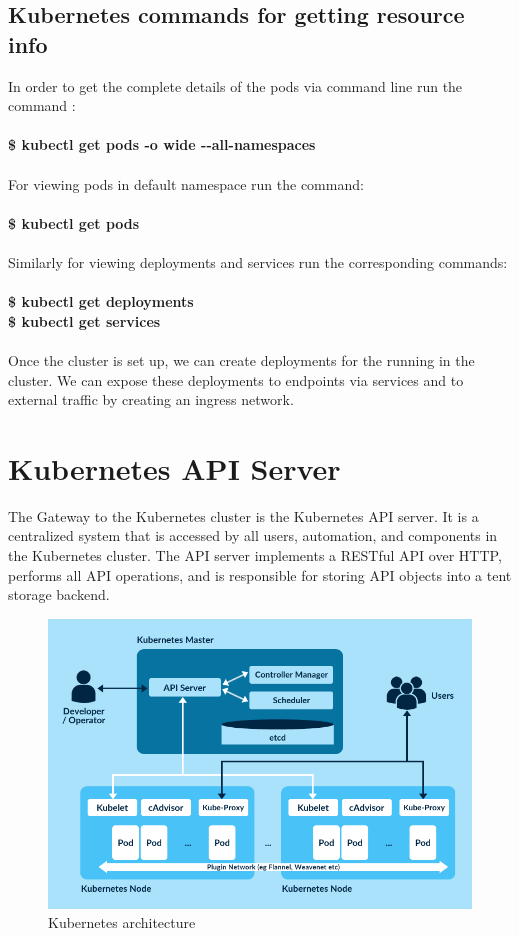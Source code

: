 \documentclass[12pt]{report}
\begin{document}
\subsection{Kubernetes commands for getting resource info}
In order to get the complete details of  the pods via command line run the command :\\\\
\textbf{\$ kubectl get pods -o wide -{}-all-namespaces}\\\\
For viewing pods in default namespace run the command:\\\\
\textbf{\$ kubectl get pods}\\\\
Similarly for viewing deployments and services run the corresponding commands:\\\\
\textbf{\$ kubectl get deployments}\\
\textbf{\$ kubectl get services}\\\\
Once the cluster is set up, we can create deployments for the running in the cluster. We can expose these deployments to endpoints via services and to external traffic by creating an ingress network.
\section{Kubernetes API Server}
The Gateway to the Kubernetes cluster is the Kubernetes API server. It is a centralized system that is accessed by all users, automation, and components in the Kubernetes cluster. The API server implements a RESTful API over HTTP, performs all API operations, and is responsible for storing API objects into a tent storage backend.
\begin{figure}[h!]
	\begin{center}
		\includegraphics[totalheight=0.32\textheight]{kubernetesapiserver}
		\caption{Kubernetes architecture \cite{KArc}}
	\end{center}
\end{figure}
\\\\
\end{document}
